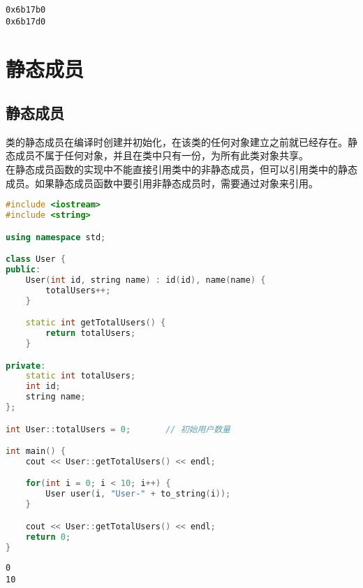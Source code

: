 \begin{tcolorbox}
	\begin{verbatim}
0x6b17b0
0x6b17d0
	\end{verbatim}
\end{tcolorbox}

\newpage

\section{静态成员}

\subsection{静态成员}

类的静态成员在编译时创建并初始化，在该类的任何对象建立之前就已经存在。静态成员不属于任何对象，并且在类中只有一份，为所有此类对象共享。\\

在静态成员函数的实现中不能直接引用类中的非静态成员，但可以引用类中的静态成员。如果静态成员函数中要引用非静态成员时，需要通过对象来引用。\\


\begin{lstlisting}[language=C++]
#include <iostream>
#include <string>

using namespace std;

class User {
public:
    User(int id, string name) : id(id), name(name) {
        totalUsers++;
    }

    static int getTotalUsers() {
        return totalUsers;
    }

private:
    static int totalUsers;
    int id;
    string name;
};

int User::totalUsers = 0;       // 初始用户数量

int main() {
    cout << User::getTotalUsers() << endl;

    for(int i = 0; i < 10; i++) {
        User user(i, "User-" + to_string(i));
    }

    cout << User::getTotalUsers() << endl;
    return 0;
}
\end{lstlisting}

\begin{tcolorbox}
	\begin{verbatim}
0
10
	\end{verbatim}
\end{tcolorbox}

